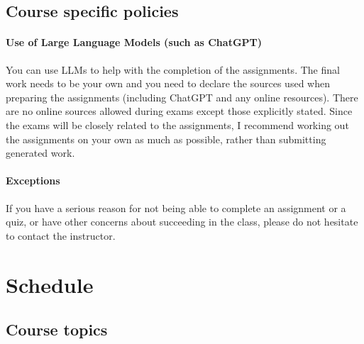 \documentclass[11pt]{article}
\begin{document}
\subsection{Course specific policies}

\paragraph{Use of Large Language Models (such as ChatGPT)} You can use LLMs to help with the completion of the assignments.
The final work needs to be your own and you need to declare the sources used when preparing the assignments
(including ChatGPT and any online resources).
There are no online sources allowed during exams except those explicitly stated.
Since the exams will be closely related to the assignments, I recommend working out the assignments on your own as much as possible,
rather than submitting generated work.

\paragraph{Exceptions} If you have a serious reason for not being able to complete an assignment or a quiz, or
have other concerns about succeeding in the class, please do not hesitate to contact the instructor.

\section{Schedule}

\subsection{Course topics}
\end{document}
